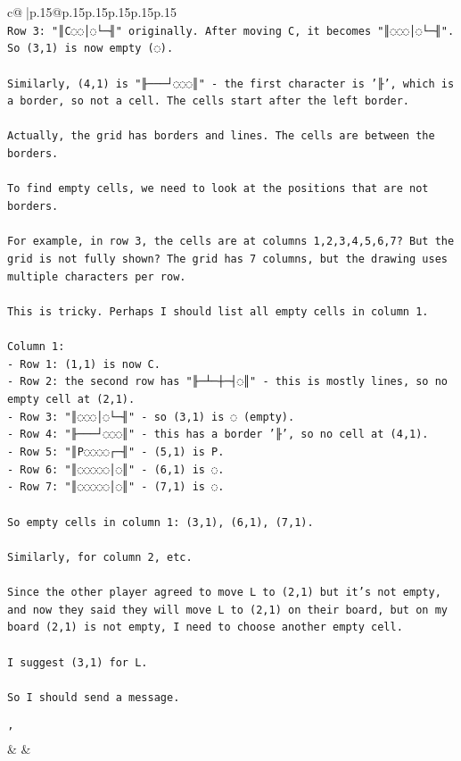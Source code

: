\documentclass{article}
\begin{document}
{\begin{supertabular}{c@{$\;$}|p{.15\linewidth}@{}p{.15\linewidth}p{.15\linewidth}p{.15\linewidth}p{.15\linewidth}p{.15\linewidth}}
{{{\\ 
\texttt{Row 3: "║C◌◌│◌└─╢" originally. After moving C, it becomes "║◌◌◌│◌└─╢". So (3,1) is now empty (◌).} \\
\\ 
\texttt{Similarly, (4,1) is "╟───┘◌◌◌║" {-} the first character is '╟', which is a border, so not a cell. The cells start after the left border.} \\
\\ 
\texttt{Actually, the grid has borders and lines. The cells are between the borders.} \\
\\ 
\texttt{To find empty cells, we need to look at the positions that are not borders.} \\
\\ 
\texttt{For example, in row 3, the cells are at columns 1,2,3,4,5,6,7? But the grid is not fully shown? The grid has 7 columns, but the drawing uses multiple characters per row.} \\
\\ 
\texttt{This is tricky. Perhaps I should list all empty cells in column 1.} \\
\\ 
\texttt{Column 1:} \\
\texttt{{-} Row 1: (1,1) is now C.} \\
\texttt{{-} Row 2: the second row has "╟─┴─┼─┤◌║" {-} this is mostly lines, so no empty cell at (2,1).} \\
\texttt{{-} Row 3: "║◌◌◌│◌└─╢" {-} so (3,1) is ◌ (empty).} \\
\texttt{{-} Row 4: "╟───┘◌◌◌║" {-} this has a border '╟', so no cell at (4,1).} \\
\texttt{{-} Row 5: "║P◌◌◌◌┌─╢" {-} (5,1) is P.} \\
\texttt{{-} Row 6: "║◌◌◌◌◌│◌║" {-} (6,1) is ◌.} \\
\texttt{{-} Row 7: "║◌◌◌◌◌│◌║" {-} (7,1) is ◌.} \\
\\ 
\texttt{So empty cells in column 1: (3,1), (6,1), (7,1).} \\
\\ 
\texttt{Similarly, for column 2, etc.} \\
\\ 
\texttt{Since the other player agreed to move L to (2,1) but it's not empty, and now they said they will move L to (2,1) on their board, but on my board (2,1) is not empty, I need to choose another empty cell.} \\
\\ 
\texttt{I suggest (3,1) for L.} \\
\\ 
\texttt{So I should send a message.} \\
\\ 
\texttt{'} \\
            }
        }
    }
    & & \\ \\


\end{supertabular}}
\end{document}
